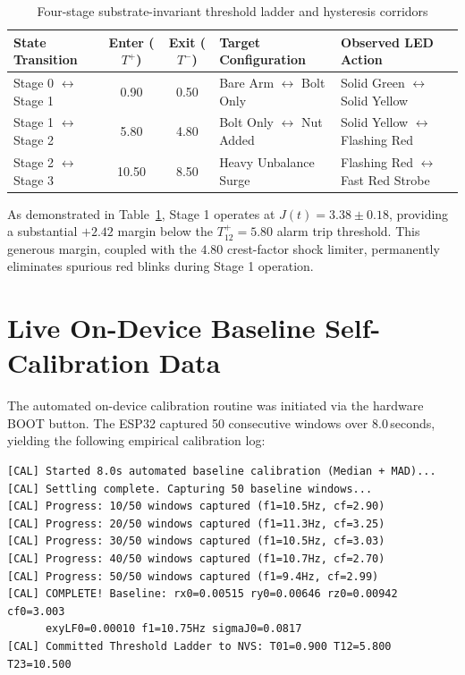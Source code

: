 \begin{table}[H]
\centering
\caption{Four-stage substrate-invariant threshold ladder and hysteresis corridors}
\label{tab:threshold_corridors}
\small
\begin{tabularx}{\textwidth}{X c c X X}
\toprule
\textbf{State Transition} & \textbf{Enter ($T^+$)} & \textbf{Exit ($T^-$)} & \textbf{Target Configuration} & \textbf{Observed LED Action} \\
\midrule
Stage 0 $\leftrightarrow$ Stage 1 & 0.90 & 0.50 & Bare Arm $\leftrightarrow$ Bolt Only & Solid Green $\leftrightarrow$ Solid Yellow \\
Stage 1 $\leftrightarrow$ Stage 2 & 5.80 & 4.80 & Bolt Only $\leftrightarrow$ Nut Added & Solid Yellow $\leftrightarrow$ Flashing Red \\
Stage 2 $\leftrightarrow$ Stage 3 & 10.50 & 8.50 & Heavy Unbalance Surge & Flashing Red $\leftrightarrow$ Fast Red Strobe \\
\bottomrule
\end{tabularx}
\end{table}

\hspace{2em}As demonstrated in Table~\ref{tab:threshold_corridors}, Stage 1 operates at $J(t) = 3.38 \pm 0.18$, providing a substantial $+2.42$ margin below the $T_{12}^+ = 5.80$ alarm trip threshold. This generous margin, coupled with the $4.80$ crest-factor shock limiter, permanently eliminates spurious red blinks during Stage 1 operation.

\section{Live On-Device Baseline Self-Calibration Data}
\hspace{2em}The automated on-device calibration routine was initiated via the hardware BOOT button. The ESP32 captured 50 consecutive windows over $8.0$\,seconds, yielding the following empirical calibration log:
\begin{verbatim}
[CAL] Started 8.0s automated baseline calibration (Median + MAD)...
[CAL] Settling complete. Capturing 50 baseline windows...
[CAL] Progress: 10/50 windows captured (f1=10.5Hz, cf=2.90)
[CAL] Progress: 20/50 windows captured (f1=11.3Hz, cf=3.25)
[CAL] Progress: 30/50 windows captured (f1=10.5Hz, cf=3.03)
[CAL] Progress: 40/50 windows captured (f1=10.7Hz, cf=2.70)
[CAL] Progress: 50/50 windows captured (f1=9.4Hz, cf=2.99)
[CAL] COMPLETE! Baseline: rx0=0.00515 ry0=0.00646 rz0=0.00942 cf0=3.003
      exyLF0=0.00010 f1=10.75Hz sigmaJ0=0.0817
[CAL] Committed Threshold Ladder to NVS: T01=0.900 T12=5.800 T23=10.500
\end{verbatim}

